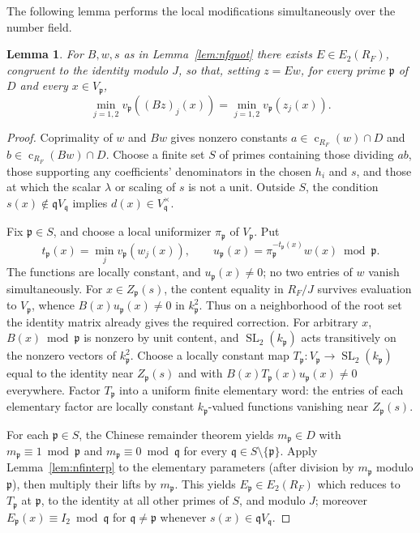 \documentclass[11pt]{amsart}
\newtheorem{lemma}[theorem]{Lemma}
\theoremstyle{definition}
\theoremstyle{remark}
\newcommand{\cont}{\operatorname{c}}
\newcommand{\SL}{\operatorname{SL}}
\begin{document}
The following lemma performs the local modifications simultaneously over the number field.
\begin{lemma}\label{lem:nfpatch}
For $B,w,s$ as in Lemma~\ref{lem:nfquot} there exists
$E\in E_2(R_F)$, congruent to the identity modulo $J$,
so that, setting $z=Ew$, for every prime $\mathfrak p$ of $D$
and every $x\in V_{\mathfrak p}$,
\[
\min_{j=1,2}v_{\mathfrak p}((Bz)_j(x))
=\min_{j=1,2}v_{\mathfrak p}(z_j(x)).
\]
\end{lemma}
\begin{proof}
Coprimality of $w$ and $Bw$ gives nonzero constants
$a\in\cont_{R_F}(w)\cap D$ and
$b\in\cont_{R_F}(Bw)\cap D$.
Choose a finite set $S$ of primes containing those dividing
$ab$, those supporting any coefficients' denominators in the chosen
$h_i$ and $s$, and those at which the scalar $\lambda$ or
scaling of $s$ is not a unit. Outside $S$, the condition
$s(x)\notin\mathfrak q V_{\mathfrak q}$ implies
$d(x)\in V_{\mathfrak q}^{\times}$.

Fix $\mathfrak p\in S$, and choose a local uniformizer
$\pi_{\mathfrak p}$ of $V_{\mathfrak p}$.  Put
\[
t_{\mathfrak p}(x)=\min_j v_{\mathfrak p}(w_j(x)),\qquad
u_{\mathfrak p}(x)=
\pi_{\mathfrak p}^{-t_{\mathfrak p}(x)}w(x)\bmod\mathfrak p.
\]
The functions are locally constant, and
$u_{\mathfrak p}(x)\ne0$; no two entries of $w$ vanish
simultaneously. For $x\in Z_{\mathfrak p}(s)$,
the content equality in $R_F/J$ survives evaluation to
$V_{\mathfrak p}$, whence
$B(x)u_{\mathfrak p}(x)\ne0$ in $k_{\mathfrak p}^2$.
Thus on a neighborhood of the root set the identity matrix
already gives the required correction.
For arbitrary $x$, $B(x)\bmod\mathfrak p$ is nonzero by unit
content, and $\SL_2(k_{\mathfrak p})$ acts transitively on the
nonzero vectors of $k_{\mathfrak p}^2$.
Choose a locally constant map
$T_{\mathfrak p}:V_{\mathfrak p}\to\SL_2(k_{\mathfrak p})$
equal to the identity near $Z_{\mathfrak p}(s)$ and with
$B(x)T_{\mathfrak p}(x)u_{\mathfrak p}(x)\ne0$ everywhere.
Factor $T_{\mathfrak p}$ into a uniform finite elementary word:
the entries of each elementary factor are locally constant
$k_{\mathfrak p}$-valued functions vanishing near $Z_{\mathfrak p}(s)$.

For each $\mathfrak p\in S$, the Chinese remainder theorem yields
$m_{\mathfrak p}\in D$ with
$m_{\mathfrak p}\equiv1\bmod\mathfrak p$ and
$m_{\mathfrak p}\equiv0\bmod\mathfrak q$ for every
$\mathfrak q\in S\setminus\{\mathfrak p\}$.
Apply Lemma~\ref{lem:nfinterp} to the elementary parameters
(after division by $m_{\mathfrak p}$ modulo $\mathfrak p$), then
multiply their lifts by $m_{\mathfrak p}$. This yields
$E_{\mathfrak p}\in E_2(R_F)$ which reduces to
$T_{\mathfrak p}$ at $\mathfrak p$, to the identity at all
other primes of $S$, and modulo $J$; moreover
$E_{\mathfrak p}(x)\equiv I_2\bmod\mathfrak q$ for
$\mathfrak q\ne\mathfrak p$ whenever
$s(x)\in\mathfrak q V_{\mathfrak q}$.


\end{proof}
\end{document}
